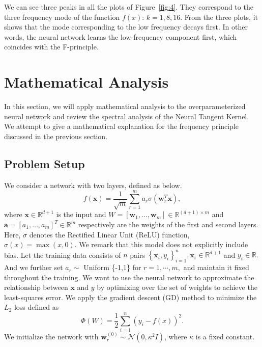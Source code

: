 \documentclass[letterpaper,12pt]{article}
\begin{document}
We can see three peaks in all the plots of Figure~\ref{fig:4}. They correspond to the three frequency mode of the function $f(x)$: $k=1,8,16$. From the three plots, it shows that the mode corresponding to the low frequency decays first. In other words, the neural network learns the low-frequency component first, which coincides with the F-principle.


\section{Mathematical Analysis}
In this section, we will apply mathematical analysis to the overparameterized neural network and review the spectral analysis of the Neural Tangent Kernel. We attempt to give a mathematical explanation for the frequency principle discussed in the previous section.

\subsection{Problem Setup}
We consider a network with two layers, defined as below.
\begin{equation}
f(\mathbf{x})=\frac{1}{\sqrt{m}} \sum_{r=1}^{m} a_{r} \sigma\left(\mathbf{w}_{r}^{T} \mathbf{x}\right),
\end{equation}
where $\mathbf{x} \in \mathbb{R}^{d+1}$ is the input and $ W=\left[\mathbf{w}_{1}, \ldots, \mathbf{w}_{m}\right] \in \mathbb{R}^{(d+1) \times m} $ and
$\mathbf{a}=\left[a_{1}, \ldots, a_{m}\right]^{T} \in \mathbb{R}^{m}$ respectively are the weights of the first and second layers. Here, $\sigma$ denotes the Rectified Linear Unit (ReLU) function, $\sigma(x)=\max (x, 0)$. We remark that this model does not explicitly include bias. Let the training data consists of $n$ pairs $\left\{\mathbf{x}_{i}, y_{i}\right\}_{i=1}^{n}, \mathbf{x}_{i} \in \mathbb{R}^{d+1}$ and $y_{i} \in \mathbb{R} .$ And we further set $a_{r} \sim$ Uniform \{-1,1\} for $r=1, \cdots, m,$ and maintain it fixed throughout the training. We want to use the neural network to approximate the relationship between $\mathbf{x}$ and $y$ by optimizing over the set of weights to achieve the least-squares error. We apply the gradient descent (GD) method to minimize the $L_{2}$ loss defined as
\begin{equation}
\Phi(W)=\frac{1}{2} \sum_{i=1}^{n}(y_{i}-f(x))^{2}.
\end{equation}
We initialize the network with $\mathbf{w}_{r}^{(0)} \sim \mathcal{N}\left(0, \kappa^{2} I\right)$, where $\kappa$ is a fixed constant.
\end{document}
